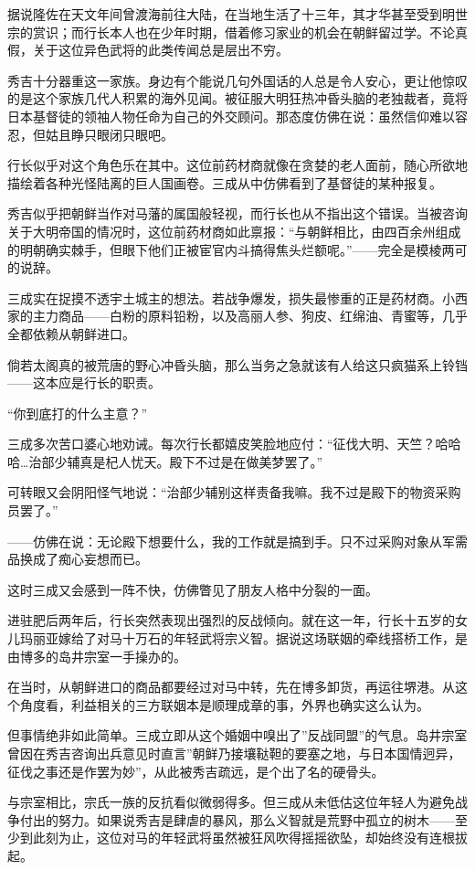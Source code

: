 \documentclass[
]{article}
\begin{document}
据说隆佐在天文年间曾渡海前往大陆，在当地生活了十三年，其才华甚至受到明世宗的赏识；而行长本人也在少年时期，借着修习家业的机会在朝鲜留过学。不论真假，关于这位异色武将的此类传闻总是层出不穷。

秀吉十分器重这一家族。身边有个能说几句外国话的人总是令人安心，更让他惊叹的是这个家族几代人积累的海外见闻。被征服大明狂热冲昏头脑的老独裁者，竟将日本基督徒的领袖人物任命为自己的外交顾问。那态度仿佛在说：虽然信仰难以容忍，但姑且睁只眼闭只眼吧。

行长似乎对这个角色乐在其中。这位前药材商就像在贪婪的老人面前，随心所欲地描绘着各种光怪陆离的巨人国画卷。三成从中仿佛看到了基督徒的某种报复。

秀吉似乎把朝鲜当作对马藩的属国般轻视，而行长也从不指出这个错误。当被咨询关于大明帝国的情况时，这位前药材商如此禀报：``与朝鲜相比，由四百余州组成的明朝确实棘手，但眼下他们正被宦官内斗搞得焦头烂额呢。''------完全是模棱两可的说辞。

三成实在捉摸不透宇土城主的想法。若战争爆发，损失最惨重的正是药材商。小西家的主力商品------白粉的原料铅粉，以及高丽人参、狗皮、红绵油、青蜜等，几乎全都依赖从朝鲜进口。

倘若太阁真的被荒唐的野心冲昏头脑，那么当务之急就该有人给这只疯猫系上铃铛------这本应是行长的职责。

``你到底打的什么主意？''

三成多次苦口婆心地劝诫。每次行长都嬉皮笑脸地应付：``征伐大明、天竺？哈哈哈\ldots 治部少辅真是杞人忧天。殿下不过是在做美梦罢了。''

可转眼又会阴阳怪气地说：``治部少辅别这样责备我嘛。我不过是殿下的物资采购员罢了。''

------仿佛在说：无论殿下想要什么，我的工作就是搞到手。只不过采购对象从军需品换成了痴心妄想而已。

这时三成又会感到一阵不快，仿佛瞥见了朋友人格中分裂的一面。

进驻肥后两年后，行长突然表现出强烈的反战倾向。就在这一年，行长十五岁的女儿玛丽亚嫁给了对马十万石的年轻武将宗义智。据说这场联姻的牵线搭桥工作，是由博多的岛井宗室一手操办的。

在当时，从朝鲜进口的商品都要经过对马中转，先在博多卸货，再运往堺港。从这个角度看，利益相关的三方联姻本是顺理成章的事，外界也确实这么认为。

但事情绝非如此简单。三成立即从这个婚姻中嗅出了''反战同盟''的气息。岛井宗室曾因在秀吉咨询出兵意见时直言''朝鲜乃接壤鞑靼的要塞之地，与日本国情迥异，征伐之事还是作罢为妙''，从此被秀吉疏远，是个出了名的硬骨头。

与宗室相比，宗氏一族的反抗看似微弱得多。但三成从未低估这位年轻人为避免战争付出的努力。如果说秀吉是肆虐的暴风，那么义智就是荒野中孤立的树木------至少到此刻为止，这位对马的年轻武将虽然被狂风吹得摇摇欲坠，却始终没有连根拔起。
\end{document}

